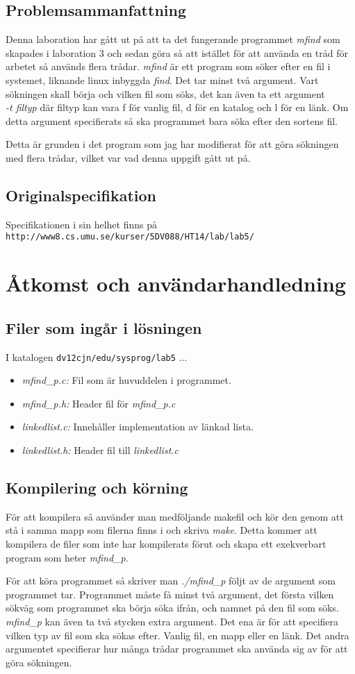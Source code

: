 \documentclass[11pt, titlepage, oneside, a4paper]{article}
\newcommand{\Section}[1]{\section{#1}\vspace{-8pt}}
\newcommand{\Subsection}[1]{\vspace{-4pt}\subsection{#1}\vspace{-8pt}}
\def\username{dv12cjn}
\def\path{edu/sysprog/lab5}
\def\fullpath{\raisebox{1pt}{$\scriptstyle \sim$}\username/\path}
\begin{document}
		\Subsection{Problemsammanfattning}
		Denna laboration har gått ut på att ta det fungerande programmet \emph{mfind} som skapades i laboration 3 och sedan göra så att istället för att använda en tråd för arbetet så används flera trådar.
		\emph{mfind} är ett program som söker efter en fil i systemet, liknande linux inbyggda \emph{find}. Det tar minst två argument. Vart sökningen skall börja och vilken fil som söks, det kan även 
		ta ett argument \\ \emph{-t filtyp} där filtyp kan vara f för vanlig fil, d för en katalog och l för en länk. Om detta argument specifierats så ska programmet bara söka efter den sortens fil.
		
		Detta är grunden i det program som jag har modifierat för att göra sökningen med flera trådar, vilket var vad denna uppgift gått ut på.
		
		\Subsection{Originalspecifikation}
			Specifikationen i sin helhet finns på\\
                        \verb!http://www8.cs.umu.se/kurser/5DV088/HT14/lab/lab5/!

	\Section{Åtkomst och användarhandledning}
		
		\Subsection{Filer som ingår i lösningen}
			I katalogen \texttt{\fullpath} ...
		
		\begin{itemize} 
		 \item \emph{mfind\_p.c:} Fil som är huvuddelen i programmet.
		 \item \emph{mfind\_p.h:} Header fil för \emph{mfind\_p.c}
		 \item \emph{linkedlist.c:} Innehåller implementation av länkad lista.
		 \item \emph{linkedlist.h:} Header fil till \emph{linkedlist.c}
		\end{itemize}

		\Subsection{Kompilering och körning}
		För att kompilera så använder man medföljande makefil och kör den genom att stå i samma mapp som filerna finns i och skriva
		\emph{make}. Detta kommer att kompilera de filer som inte har kompilerats förut och skapa ett exekverbart program som heter \emph{mfind\_p}.
		
		För att köra programmet så skriver man \emph{./mfind\_p} följt av de argument som programmet tar. 
		Programmet måste få minst två argument, det första vilken sökväg som programmet ska börja söka ifrån, och namnet på den fil som
		söks. \emph{mfind\_p} kan även ta två stycken extra argument. Det ena är för att specifiera vilken typ av fil som ska sökas efter. Vanlig fil, en mapp eller en länk.
		Det andra argumentet specifierar hur många trådar programmet ska använda sig av för att göra sökningen.
		
\end{document}

